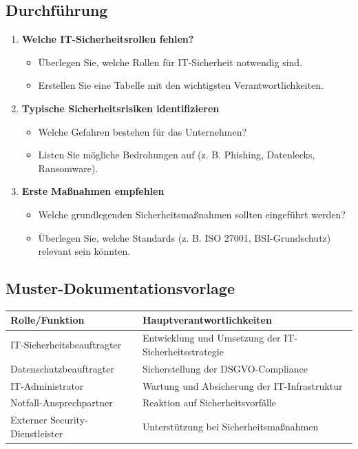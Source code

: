 \documentclass{orgstandard}
\begin{document}
\subsection{Durchführung}
\label{sec:org326c042}

\begin{enumerate}
\item \textbf{Welche IT-Sicherheitsrollen fehlen?}
\begin{itemize}
\item Überlegen Sie, welche Rollen für IT-Sicherheit notwendig sind.
\item Erstellen Sie eine Tabelle mit den wichtigsten Verantwortlichkeiten.
\end{itemize}

\item \textbf{Typische Sicherheitsrisiken identifizieren}
\begin{itemize}
\item Welche Gefahren bestehen für das Unternehmen?
\item Listen Sie mögliche Bedrohungen auf (z. B. Phishing, Datenlecks, Ransomware).
\end{itemize}

\item \textbf{Erste Maßnahmen empfehlen}
\begin{itemize}
\item Welche grundlegenden Sicherheitsmaßnahmen sollten eingeführt werden?
\item Überlegen Sie, welche Standards (z. B. ISO 27001, BSI-Grundschutz) relevant sein könnten.
\end{itemize}
\end{enumerate}
\subsection{Muster-Dokumentationsvorlage}
\label{sec:org6b12023}

\begin{center}
\begin{tabular}{ll}
Rolle/Funktion & Hauptverantwortlichkeiten\\
\hline
IT-Sicherheitsbeauftragter & Entwicklung und Umsetzung der IT-Sicherheitsstrategie\\
Datenschutzbeauftragter & Sicherstellung der DSGVO-Compliance\\
IT-Administrator & Wartung und Absicherung der IT-Infrastruktur\\
Notfall-Ansprechpartner & Reaktion auf Sicherheitsvorfälle\\
Externer Security-Dienstleister & Unterstützung bei Sicherheitsmaßnahmen\\
\end{tabular}
\end{center}
\end{document}
